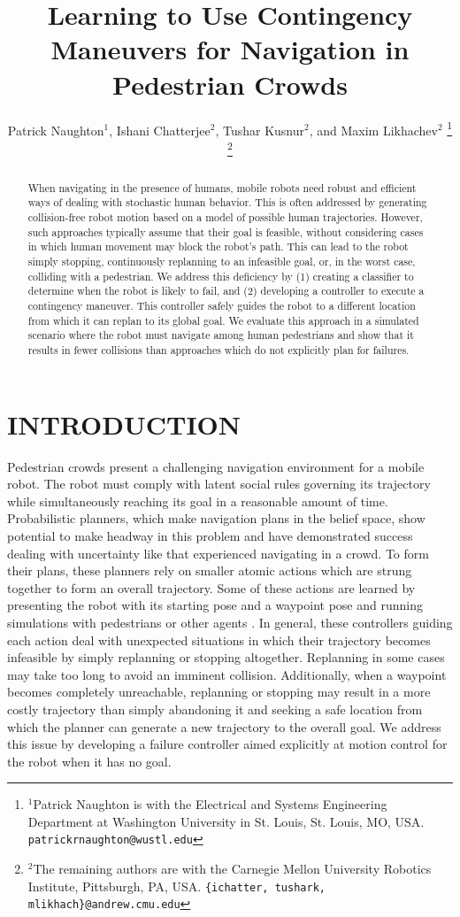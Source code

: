 \documentclass[letterpaper, 10 pt, conference]{ieeeconf}  %
\title{\LARGE \bf
	Learning to Use Contingency Maneuvers for Navigation in Pedestrian Crowds
}
\author{Patrick Naughton$^{1}$, Ishani Chatterjee$^{2}$, Tushar Kusnur$^{2}$, and Maxim Likhachev$^{2}$%
\thanks{$^{1}$Patrick Naughton is with the Electrical and Systems Engineering Department at Washington University in St. Louis, St. Louis, MO, USA. 
        {\tt\small patrickrnaughton@wustl.edu}}%
\thanks{$^{2}$The remaining authors are with the Carnegie Mellon University Robotics Institute, Pittsburgh, PA, USA.
        {\tt\small \{ichatter, tushark, mlikhach\}@andrew.cmu.edu}}%
}
\begin{document}
\newcolumntype{Z}{S[
	table-format=1.2,%
	round-mode=places,
	round-precision=2]}


\maketitle
\thispagestyle{empty}
\pagestyle{empty}


\begin{abstract}
	When navigating in the presence of humans, mobile robots need robust and efficient ways of dealing with stochastic human behavior. This is often addressed by generating collision-free robot motion based on a model of possible human trajectories. However, such approaches typically assume that their goal is feasible, without considering cases in which human movement may block the robot's path. This can lead to the robot simply stopping, continuously replanning to an infeasible goal, or, in the worst case, colliding with a pedestrian. We address this deficiency by (1) creating a classifier to determine when the robot is likely to fail, and (2) developing a controller to execute a contingency maneuver. This controller safely guides the robot to a different location from which it can replan to its global goal. We evaluate this approach in a simulated scenario where the robot must navigate among human pedestrians and show that it results in fewer collisions than approaches which do not explicitly plan for failures.
\end{abstract}


\section{INTRODUCTION}
	Pedestrian crowds present a challenging navigation environment for a mobile robot. The robot must comply with latent social rules governing its trajectory while simultaneously reaching its goal in a reasonable amount of time. Probabilistic planners, which make navigation plans in the belief space, show potential to make headway in this problem and have demonstrated success dealing with uncertainty \cite{ppcp} like that experienced navigating in a crowd. To form their plans, these planners rely on smaller atomic actions which are strung together to form an overall trajectory. Some of these actions are learned by presenting the robot with its starting pose and a waypoint pose and running simulations with pedestrians or other agents \cite{crowdawarerl}. In general, these controllers guiding each action deal with unexpected situations in which their trajectory becomes infeasible by simply replanning or stopping altogether. Replanning in some cases may take too long to avoid an imminent collision. Additionally, when a waypoint becomes completely unreachable, replanning or stopping may result in a more costly trajectory than simply abandoning it and seeking a safe location from which the planner can generate a new trajectory to the overall goal. We address this issue by developing a failure controller aimed explicitly at motion control for the robot when it has no goal.
	
\end{document}
